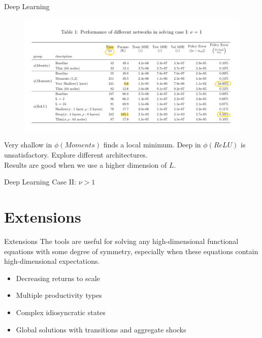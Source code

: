 \documentclass[dvipsnames,mathserif]{beamer}
\begin{document}
{\begin{frame}{Deep Learning}
\begin{figure}[h!]
\centering
\includegraphics[width = \textwidth]{6.png}
\end{figure}
Very shallow in $\phi(Moments)$ finds a local minimum. Deep in $\phi(ReLU)$ is unsatisfactory. Explore different architectures.\\
Results are good when we use a higher dimension of $L$.

\end{frame}

\begin{frame}{Deep Learning}
Case II: $\nu > 1$
\end{frame}

\section{Extensions}
\begin{frame}{Extensions}
The tools are useful for solving any high-dimensional functional equations with some degree of symmetry, especially when these equations contain high-dimensional expectations.
    \begin{itemize}
        \item Decreasing returns to scale\\
        \vspace{0.2cm}
        \item Multiple productivity types\\
        \vspace{0.2cm}
        \item Complex idiosyncratic states\\
        \vspace{0.2cm}
        \item Global solutions with transitions and aggregate shocks


\end{itemize}
\end{frame}}
\end{document}
